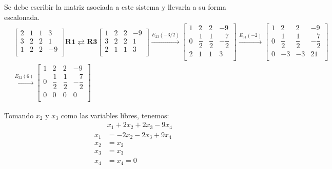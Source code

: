 \documentclass[12pt,a4paper]{report}
\begin{document}
\begin{enumerate}
\begin{enumerate}
Se debe escribir la matriz asociada a este sistema y llevarla a su forma escalonada.\\
\begin{align*}
&\begin{bmatrix}
2 & 1 & 1 & 3\\
3 & 2 & 2 & 1\\
1 & 2 & 2 & -9\\
\end{bmatrix}
\textbf{R1}\rightleftarrows \textbf{R3}
\begin{bmatrix}
1 & 2 & 2 & -9\\
3 & 2 & 2 & 1\\
2 & 1 & 1 & 3\\
\end{bmatrix}
\xrightarrow{E_{23}(-3/2)}
\begin{bmatrix}
1 & 2 & 2 & -9\\
0 & \dfrac{1}{2} & \dfrac{1}{2} & -\dfrac{7}{2}\\
2 & 1 & 1 & 3\\
\end{bmatrix}
\xrightarrow{E_{31}(-2)}
\begin{bmatrix}
1 & 2 & 2 & -9\\
0 & \dfrac{1}{2} & \dfrac{1}{2} & -\dfrac{7}{2}\\
0 & -3 & -3 & 21\\
\end{bmatrix}\\
&\xrightarrow{E_{32}(6)}
\begin{bmatrix}
1 & 2 & 2 & -9\\
0 & \dfrac{1}{2} & \dfrac{1}{2} & -\dfrac{7}{2}\\
0 & 0 & 0 & 0\\
\end{bmatrix}
\end{align*}


Tomando $x_2 $ y $x_3 $ como las variables libres, tenemos:\\
\begin{align*}
&x_{1}+2x_{2}+2x_{3}-9x_{4}\\
x_{1}&=-2x_{2}-2x_{3}+9x_{4}\\
x_{2}&=x_{2}\\
x_{3}&=x_{3}\\
x_{4}&=x_{4}=0
\end{align*}


\end{enumerate}
\end{enumerate}
\end{document}
